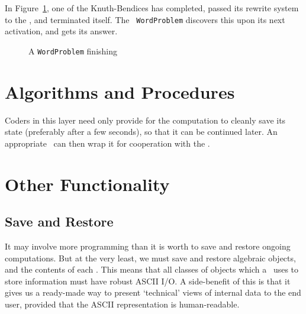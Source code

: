In Figure~\ref{wordprob2}, one of the Knuth-Bendices has completed,
passed its rewrite system to the \GIC, and terminated itself. The {\tt
WordProblem} discovers this upon its next activation, and gets its
answer.

\begin{figure}[hbtp]
\caption{A {\tt WordProblem} finishing}\label{wordprob2}
\end{figure}


\section{Algorithms and Procedures}

Coders in this layer need only provide for the computation to cleanly
save its state (preferably after a few seconds), so that it can be
continued later. An appropriate \CM\ can then wrap it for cooperation
with the \SM.


\section{Other Functionality}

\subsection{Save and Restore}

It may involve more programming than it is worth to save and restore
ongoing computations. But at the very least, we must save and restore
algebraic objects, and the contents of each \GIC. This means that all
classes of objects which a \GIC\ uses to store information must have
robust ASCII I/O. A side-benefit of this is that it gives us a
ready-made way to present `technical' views of internal data to the
end user, provided that the ASCII representation is human-readable.
